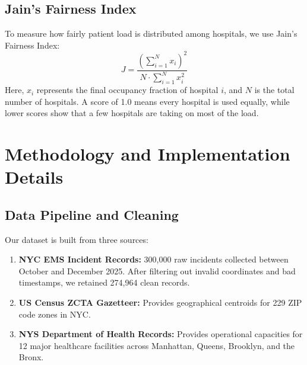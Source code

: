 \documentclass[11pt,a4paper]{article}
\begin{document}
\subsection{Jain's Fairness Index}
To measure how fairly patient load is distributed among hospitals, we use Jain's Fairness Index:
\begin{equation}
    J = \frac{\left( \sum_{i=1}^{N} x_i \right)^2}{N \cdot \sum_{i=1}^{N} x_i^2}
\end{equation}
Here, $x_i$ represents the final occupancy fraction of hospital $i$, and $N$ is the total number of hospitals. A score of 1.0 means every hospital is used equally, while lower scores show that a few hospitals are taking on most of the load.

\section{Methodology and Implementation Details}
\label{sec:methodology}

\subsection{Data Pipeline and Cleaning}
Our dataset is built from three sources:
\begin{enumerate}[leftmargin=*]
    \item \textbf{NYC EMS Incident Records:} 300,000 raw incidents collected between October and December 2025. After filtering out invalid coordinates and bad timestamps, we retained 274,964 clean records.
    \item \textbf{US Census ZCTA Gazetteer:} Provides geographical centroids for 229 ZIP code zones in NYC.
    \item \textbf{NYS Department of Health Records:} Provides operational capacities for 12 major healthcare facilities across Manhattan, Queens, Brooklyn, and the Bronx.
\end{enumerate}
\end{document}
